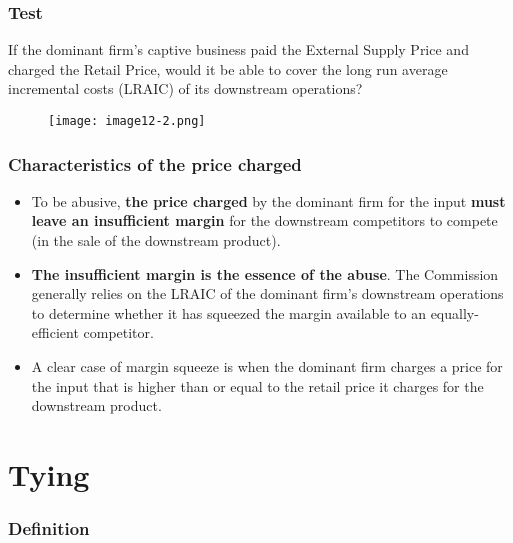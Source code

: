 
        \subsubsection{Test}

            If the dominant firm’s captive business paid the External Supply Price and charged the Retail Price, would it be able to cover the long run average incremental costs (LRAIC) of its downstream operations?

            \begin{figure}[ht]
                \centering
                \texttt{[image: image12-2.png]}
            \end{figure}
            
        \subsubsection{Characteristics of the price charged} 

            \begin{itemize}
                \item To be abusive, \textbf{the price charged} by the dominant firm for the input \textbf{must leave an insufficient margin} for the downstream competitors to compete (in the sale of the downstream product).
                \item \textbf{The insufficient margin is the essence of the abuse}. The Commission generally relies on the LRAIC of the dominant firm’s downstream operations to determine whether it has squeezed the margin available to an equally-efficient competitor. 
                \item A clear case of margin squeeze is when the dominant firm charges a price for the input that is higher than or equal to the retail price it charges for the downstream product.
            \end{itemize}
      
\section{Tying}

        \subsubsection{Definition}


